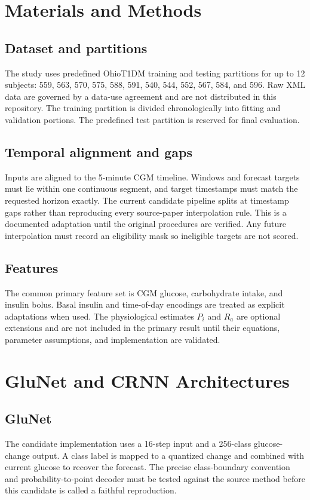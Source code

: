 \documentclass[conference]{IEEEtran}
\begin{document}
\section{Materials and Methods}
\subsection{Dataset and partitions}
The study uses predefined OhioT1DM training and testing partitions for up to 12 subjects: 559, 563, 570, 575, 588, 591, 540, 544, 552, 567, 584, and 596. Raw XML data are governed by a data-use agreement and are not distributed in this repository. The training partition is divided chronologically into fitting and validation portions. The predefined test partition is reserved for final evaluation.

\subsection{Temporal alignment and gaps}
Inputs are aligned to the 5-minute CGM timeline. Windows and forecast targets must lie within one continuous segment, and target timestamps must match the requested horizon exactly. The current candidate pipeline splits at timestamp gaps rather than reproducing every source-paper interpolation rule. This is a documented adaptation until the original procedures are verified. Any future interpolation must record an eligibility mask so ineligible targets are not scored.

\subsection{Features}
The common primary feature set is CGM glucose, carbohydrate intake, and insulin bolus. Basal insulin and time-of-day encodings are treated as explicit adaptations when used. The physiological estimates $P_i$ and $R_a$ are optional extensions and are not included in the primary result until their equations, parameter assumptions, and implementation are validated.

\section{GluNet and CRNN Architectures}
\subsection{GluNet}
The candidate implementation uses a 16-step input and a 256-class glucose-change output. A class label is mapped to a quantized change and combined with current glucose to recover the forecast. The precise class-boundary convention and probability-to-point decoder must be tested against the source method before this candidate is called a faithful reproduction.
\end{document}
